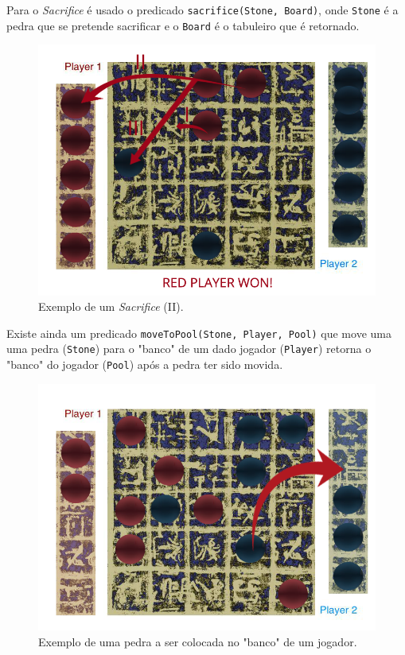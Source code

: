 \documentclass[a4paper]{article}
\begin{document}
Para o \textit{Sacrifice} é usado o predicado \texttt{sacrifice(Stone, Board)}, onde \texttt{Stone} é a pedra que se pretende sacrificar e o \texttt{Board} é o tabuleiro que é retornado.

\begin{figure}[!htb]
	\centering
	\includegraphics[scale=0.3]{images/sacrifice.png}
	\caption{Exemplo de um \textit{Sacrifice} (II).}
\end{figure}

Existe ainda um predicado \texttt{moveToPool(Stone, Player, Pool)} que move uma uma pedra (\texttt{Stone}) para o "banco" de um dado jogador (\texttt{Player}) retorna o "banco" do jogador (\texttt{Pool}) após a pedra ter sido movida.

\begin{figure}[!htb]
	\centering
	\includegraphics[scale=0.2]{images/pool.png}
	\caption{Exemplo de uma pedra a ser colocada no "banco" de um jogador.}
\end{figure}
\end{document}
